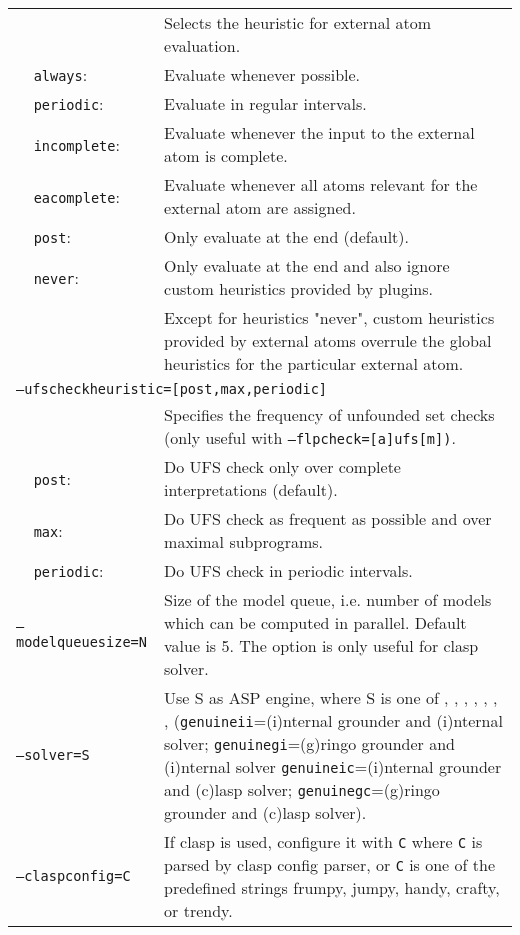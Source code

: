 \documentclass[a4paper, titlepage]{article}
\begin{document}
\begin{longtable}{ p{2.0em} p{2.2cm} p{0.6cm} p{8.0cm} }
& & & Selects the heuristic for external atom evaluation.\\
&\texttt{always}:&&Evaluate whenever possible.\\
&\texttt{periodic}:&&Evaluate in regular intervals.\\
&\texttt{incomplete}:&&Evaluate whenever the input to the external atom is complete.\\
&\texttt{eacomplete}:&& Evaluate whenever all atoms relevant for the external atom are assigned.\\
&\texttt{post}:&&Only evaluate at the end (default).\\
&\texttt{never}:&&Only evaluate at the end and also ignore custom heuristics provided by plugins.\\
&&&Except for heuristics "never", custom heuristics provided by external atoms overrule the global heuristics for the particular external atom.\\
\multicolumn{4}{l}{\texttt{--ufscheckheuristic=[post,max,periodic]}}\\
& & & Specifies the frequency of unfounded set checks (only useful with \texttt{--flpcheck=[a]ufs[m])}.\\
&\texttt{post}:&&Do UFS check only over complete interpretations (default).\\
&\texttt{max}:&&Do UFS check as frequent as possible and over maximal subprograms.\\
&\texttt{periodic}:&&Do UFS check in periodic intervals.\\
\multicolumn{3}{l}{\texttt{--modelqueuesize=N}} &
  Size of the model queue, i.e. number of models which can be computed in parallel. Default value is 5. The option is only useful for clasp solver.\\
\multicolumn{3}{l}{\texttt{--solver=S}} &
  Use S as ASP engine, where S is one of \dlv{}, \dlvdb{}, \libdlv{}, \libclingo{}, \genuineii{}, \genuinegi{}, \genuineic{}, \genuinegc{} (\texttt{genuineii}=(i)nternal grounder and (i)nternal solver; \texttt{genuinegi}=(g)ringo grounder and (i)nternal solver \texttt{genuineic}=(i)nternal grounder and (c)lasp solver; \texttt{genuinegc}=(g)ringo grounder and (c)lasp solver).\\
\multicolumn{3}{l}{\texttt{--claspconfig=C}} &
  If clasp is used, configure it with \texttt{C} where \texttt{C} is parsed by clasp config parser, or \texttt{C} is one of the predefined strings frumpy, jumpy, handy, crafty, or trendy.\\

\end{longtable}
\end{document}
